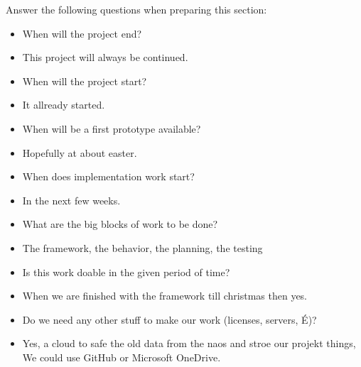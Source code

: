 \documentclass[12pt]{article}
\theoremstyle{definition}
\newenvironment{explanation}{%
   \setlength{\parindent}{0pt}
   \itshape
   \color{blue}
}{}
\begin{document}
\begin{explanation}
Answer the following questions when preparing this section:
\begin{itemize}
\item When will the project end?
\item This project will always be continued.
\item When will the project start?
\item It allready started.
\item When will be a first prototype available?
\item Hopefully at about easter.
\item When does implementation work start?
\item In the next few weeks.
\item What are the big blocks of work to be done?
\item The framework, the behavior, the planning, the testing
\item Is this work doable in the given period of time?
\item When we are finished with the framework till christmas then yes.
\item Do we need any other stuff to make our work (licenses, servers, É)?
\item Yes, a cloud to safe the old data from the naos and stroe our projekt things, We could use GitHub or Microsoft OneDrive.
\end{itemize}
\end{explanation}
\end{document}
